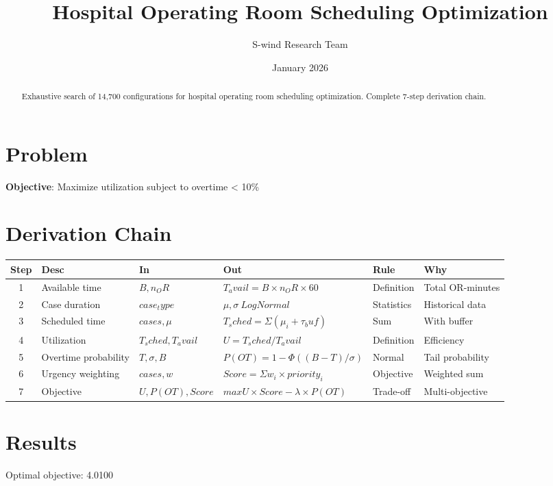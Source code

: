 \documentclass[11pt]{article}
\title{Hospital Operating Room Scheduling Optimization}
\author{S-wind Research Team}
\date{January 2026}
\begin{document}
\maketitle

\begin{abstract}
Exhaustive search of 14,700 configurations for hospital operating room scheduling optimization. Complete 7-step derivation chain.
\end{abstract}

\section{Problem}
\textbf{Objective}: Maximize utilization subject to overtime < 10\%

\section{Derivation Chain}
\begin{longtable}{|c|p{2cm}|p{2cm}|p{3cm}|p{2cm}|p{3cm}|}
\hline
Step & Desc & In & Out & Rule & Why\\\hline\endhead
1 & Available time & $B, n_OR$ & $T_avail = B × n_OR × 60$ & Definition & Total OR-minutes\\\hline
2 & Case duration & $case_type$ & $μ, σ ~ LogNormal$ & Statistics & Historical data\\\hline
3 & Scheduled time & $cases, μ$ & $T_sched = Σ (μ_i + τ_buf)$ & Sum & With buffer\\\hline
4 & Utilization & $T_sched, T_avail$ & $U = T_sched / T_avail$ & Definition & Efficiency\\\hline
5 & Overtime probability & $T, σ, B$ & $P(OT) = 1 - Φ((B-T)/σ)$ & Normal & Tail probability\\\hline
6 & Urgency weighting & $cases, w$ & $Score = Σ w_i × priority_i$ & Objective & Weighted sum\\\hline
7 & Objective & $U, P(OT), Score$ & $max U × Score - λ × P(OT)$ & Trade-off & Multi-objective\\\hline
\end{longtable}

\section{Results}
Optimal objective: 4.0100
\end{document}
